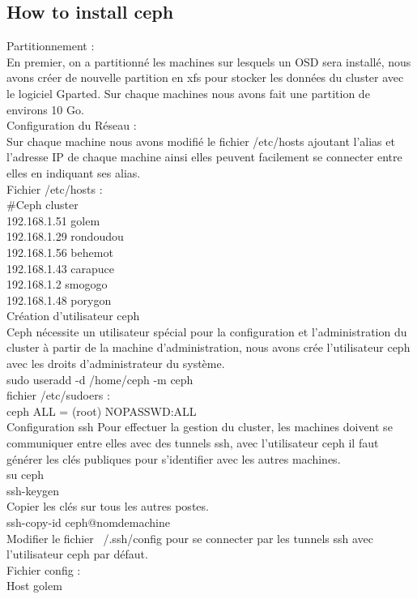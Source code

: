 \documentclass{article}
\begin{document}
  \subsection{How to install ceph}
	Partitionnement :
	\\En premier, on a partitionné les machines sur lesquels un OSD sera installé, nous avons créer de nouvelle partition en xfs pour stocker les données du cluster avec le logiciel Gparted. Sur chaque machines nous avons fait une partition de environs 10 Go.
	\\Configuration du Réseau :
	\\Sur chaque machine nous avons modifié le fichier /etc/hosts ajoutant l'alias et l'adresse IP de chaque machine ainsi elles peuvent facilement se connecter entre elles en indiquant ses alias.
\\Fichier /etc/hosts :
\\\#Ceph cluster
\\192.168.1.51 golem
\\192.168.1.29 rondoudou
\\192.168.1.56 behemot
\\192.168.1.43 carapuce
\\192.168.1.2 smogogo
\\192.168.1.48 porygon
\\Création d'utilisateur ceph
\\Ceph nécessite un utilisateur spécial pour la configuration et l'administration du cluster à partir de la machine d'administration, nous avons crée l'utilisateur ceph avec les droits d'administrateur du système.
\\ sudo useradd -d /home/ceph -m ceph
\\fichier /etc/sudoers :
\\ceph ALL = (root) NOPASSWD:ALL
\\Configuration ssh
Pour effectuer la gestion du cluster, les machines doivent se communiquer entre
elles avec des tunnels ssh, avec l'utilisateur ceph il faut générer les clés publiques pour s'identifier avec les autres machines.
\\su ceph
\\ssh-keygen
\\Copier les clés sur tous les autres postes.
\\ssh-copy-id ceph@nomdemachine
\\ Modifier le fichier ~/.ssh/config pour se connecter par les tunnels ssh avec l'utilisateur ceph par défaut.
\\Fichier config :
\\Host golem
\end{document}
